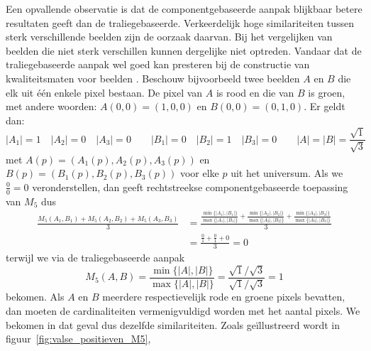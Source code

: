 Een opvallende observatie is dat de componentgebaseerde aanpak blijkbaar betere resultaten 
geeft dan de traliegebaseerde. Verkeerdelijk hoge similariteiten tussen sterk verschillende 
beelden zijn de oorzaak daarvan. Bij het vergelijken
van beelden die niet sterk verschillen kunnen dergelijke  niet optreden.
Vandaar dat de traliegebaseerde aanpak wel goed kan presteren bij de constructie van
kwaliteitsmaten voor beelden \cite{debaets:similariteitsmaten_voor_kleurbeelden}.
Beschouw bijvoorbeeld twee beelden $A$ en $B$ die elk uit \'e\'en enkele pixel bestaan. De pixel 
van $A$ is rood en die van $B$ is groen, met andere woorden: $A(0,0)=(1,0,0)$ en 
$B(0,0)=(0,1,0)$. Er geldt dan: 
\begin{displaymath}
|A_1|=1 \quad |A_2|=0 \quad |A_3|=0 \qquad |B_1|=0 \quad |B_2|=1 \quad |B_3|=0 \qquad |A|=|B|=\frac{\sqrt{1}}{\sqrt{3}}
\end{displaymath}
met $A(p)=(A_1(p),A_2(p),A_3(p))$ en $B(p)=(B_1(p),B_2(p),B_3(p))$ voor elke $p$ uit het universum. Als we
$\frac{0}{0} = 0$ veronderstellen, dan geeft rechtstreekse componentgebaseerde toepassing van 
$M_5$ dus
\begin{align*}
\displaystyle\frac{M_5(A_1,B_1)+M_5(A_2,B_2)+M_5(A_3,B_3)}{3} 
&= \displaystyle\frac{\frac{\min\{|A_1|,|B_1|\}}{\max\{|A_1|,|B_1|\}}+\frac{\min\{|A_2|,|B_2|\}}{\max\{|A_2|,|B_2|\}}+\frac{\min\{|A_3|,|B_3|\}}{\max\{|A_3|,|B_3|\}}}{3} \\
&= \displaystyle\frac{\frac{0}{1}+\frac{0}{1}+0}{3} = 0
\end{align*}
terwijl we via de traliegebaseerde aanpak
\begin{displaymath}
M_5(A,B) = \frac{\min\{|A|,|B|\}}{\max\{|A|,|B|\}} = \frac{\scriptstyle \sqrt{1} / \sqrt{3}}{\scriptstyle \sqrt{1} / \sqrt{3}} = 1
\end{displaymath}
bekomen. Als $A$ en $B$ meerdere respectievelijk rode en groene pixels bevatten, dan moeten de cardinaliteiten
vermenigvuldigd worden met het aantal pixels. We bekomen in dat geval dus dezelfde similariteiten. Zoals
ge\"illustreerd wordt in figuur~\ref{fig:valse_positieven_M5}, 

